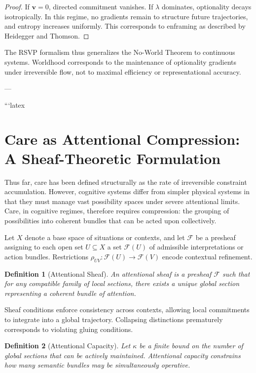 \documentclass[11pt]{article}
\newtheorem{definition}{Definition}
\theoremstyle{remark}
\begin{document}
\begin{proof}
If $\mathbf{v} = 0$, directed commitment vanishes. If $\lambda$ dominates, optionality decays isotropically. In this regime, no gradients remain to structure future trajectories, and entropy increases uniformly. This corresponds to enframing as described by Heidegger and Thomson.
\end{proof}

The RSVP formalism thus generalizes the No-World Theorem to continuous systems. Worldhood corresponds to the maintenance of optionality gradients under irreversible flow, not to maximal efficiency or representational accuracy.

---

```latex
\section{Care as Attentional Compression: A Sheaf-Theoretic Formulation}

Thus far, care has been defined structurally as the rate of irreversible constraint accumulation. However, cognitive systems differ from simpler physical systems in that they must manage vast possibility spaces under severe attentional limits. Care, in cognitive regimes, therefore requires compression: the grouping of possibilities into coherent bundles that can be acted upon collectively.

Let $X$ denote a base space of situations or contexts, and let $\mathcal{F}$ be a presheaf assigning to each open set $U \subseteq X$ a set $\mathcal{F}(U)$ of admissible interpretations or action bundles. Restrictions $\rho_{UV} : \mathcal{F}(U) \rightarrow \mathcal{F}(V)$ encode contextual refinement.

\begin{definition}[Attentional Sheaf]
An attentional sheaf is a presheaf $\mathcal{F}$ such that for any compatible family of local sections, there exists a unique global section representing a coherent bundle of attention.
\end{definition}

Sheaf conditions enforce consistency across contexts, allowing local commitments to integrate into a global trajectory. Collapsing distinctions prematurely corresponds to violating gluing conditions.

\begin{definition}[Attentional Capacity]
Let $\kappa$ be a finite bound on the number of global sections that can be actively maintained. Attentional capacity constrains how many semantic bundles may be simultaneously operative.
\end{definition}
\end{document}
